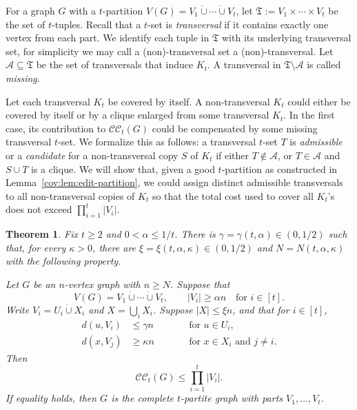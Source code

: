 \documentclass[11pt]{article}
\numberwithin{equation}{section}
\newtheorem{theorem}{Theorem}[section]
\theoremstyle{remark}
\newcommand{\dotcupunion}{\mathbin{\dot\cup}}
\newcommand{\CC}{\mathcal{CC}}
\begin{document}
For a graph \(G\) with a \(t\)-partition \(V(G)=V_1\dotcupunion\cdots\dotcupunion V_t\), let
\(\mathfrak T:=V_1\times\cdots\times V_t\) be the set of \(t\)-tuples. Recall that a \(t\)-set is
\emph{transversal} if it contains exactly one vertex from each part. We identify each tuple
in \(\mathfrak T\) with its underlying transversal set, for simplicity we may call a (non)-transversal
set a (non)-transversal. Let \(\mathcal A\subseteq\mathfrak T\) be the set of transversals that induce
\(K_t\).  A transversal in \(\mathfrak T\setminus\mathcal A\) is called \emph{missing}.

Let each transversal \(K_t\) be covered by itself. A non-transversal \(K_t\) could either be covered
by itself or by a clique enlarged from some transversal \(K_t\). In the first case, its contribution
to \(\CC_t(G)\) could be compensated by some missing transversal \(t\)-set.
We formalize this as follows: a transversal \(t\)-set \(T\) is \emph{admissible} or a \emph{candidate}
for a non-transversal copy \(S\) of \(K_t\) if either \(T\notin\mathcal A\), or \(T\in\mathcal A\) and \(S\cup T\) is a clique.
We will show that, given a good \(t\)-partition as constructed in Lemma~\ref{cov:lem:edit-partition},
we could assign distinct admissible transversals to all non-transversal copies of \(K_t\) so that
the total cost used to cover all \(K_t\)'s does not exceed \(\prod_{i=1}^t|V_i|\).

\begin{theorem}\label{cov:thm:transversal-matching}
Fix \(t\ge 2\) and \(0<\alpha\le 1/t\). There is \(\gamma=\gamma(t,\alpha)\in(0,1/2)\) such that, for every
\(\kappa>0\), there are \(\xi=\xi(t,\alpha,\kappa)\in(0,1/2)\) and \(N=N(t,\alpha,\kappa)\) with the following property.

Let \(G\) be an \(n\)-vertex graph with \(n\ge N\). Suppose that
\begin{equation*}
V(G)=V_1\dotcupunion\cdots\dotcupunion V_t,
\qquad |V_i|\ge \alpha n\quad\text{for }i\in[t].
\end{equation*}
Write $V_i=U_i\dotcupunion X_i$ and $X=\bigcup_iX_i$. Suppose \(|X|\le \xi n\), and that for \(i\in[t]\),
\begin{equation*}
  \begin{aligned}
    d(u,V_i)&\le \gamma n \qquad&&\text{for }u\in U_i,\\
    d(x,V_j)&\ge \kappa n \qquad&&\text{for }x\in X_i\text{ and }j\ne i.
  \end{aligned}
\end{equation*}
Then
\begin{equation*}
\CC_t(G)\le\prod_{i=1}^t|V_i|.
\end{equation*}
If equality holds, then $G$ is the complete $t$-partite graph with parts $V_1,\ldots,V_t$.
\end{theorem}
\end{document}
